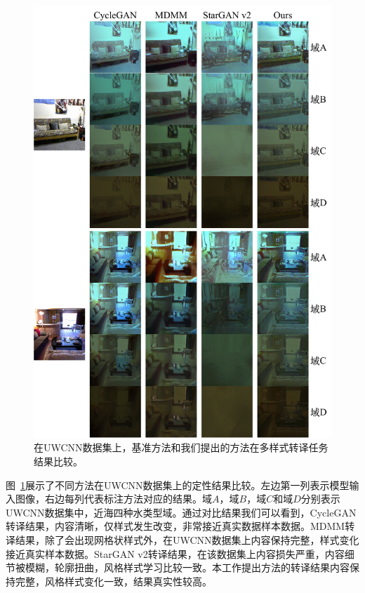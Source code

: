 \begin{figure}[htp]
    \centering
  \includegraphics[width=\textwidth]{figures/comparison_domain_uwcnn.pdf}
  \caption{在UWCNN数据集上，基准方法和我们提出的方法在多样式转译任务结果比较。}
  \label{fig:comparison_domain_uwcnn}
\end{figure}

图~\ref{fig:comparison_domain_uwcnn}展示了不同方法在UWCNN数据集上的定性结果比较。左边第一列表示模型输入图像，右边每列代表标注方法对应的结果。域$A$，域$B$，域$C$和域$D$分别表示UWCNN数据集中，近海四种水类型域。通过对比结果我们可以看到，CycleGAN转译结果，内容清晰，仅样式发生改变，非常接近真实数据样本数据。MDMM转译结果，除了会出现网格状样式外，在UWCNN数据集上内容保持完整，样式变化接近真实样本数据。StarGAN v2转译结果，在该数据集上内容损失严重，内容细节被模糊，轮廓扭曲，风格样式学习比较一致。本工作提出方法的转译结果内容保持完整，风格样式变化一致，结果真实性较高。


